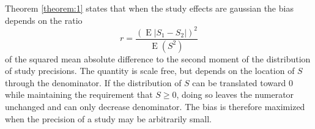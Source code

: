 \documentclass[12pt]{article}
\renewcommand{\P}{P}
\newcommand{\biasratio}{r}%
\newcommand{\s}{S}
\newcommand{\x}{X}
\DeclareMathOperator{\E}{E}
\DeclareMathOperator{\V}{Var}
\newcommand{\comment}[1]{
  \iftoggle{commenttoggle}{
    {\normalsize{\color{red}{ #1}}\normalsize}
  }
  {}
}
\begin{document}

  
  Theorem \ref{theorem:1} states that when the study effects are gaussian the bias depends on the ratio
  $$
  \biasratio=\frac{(\E|\s_1-\s_2|)^2}{\E(\s^2)}
  $$
  of the squared mean absolute difference to the second moment of the
  distribution of study precisions. The quantity is scale free, but
  depends on the location of $\s$ through the denominator. If the
  distribution of $\s$ can be translated toward $0$ while maintaining
  the requirement that $S\ge 0$, doing so leaves the numerator
  unchanged and can only decrease denominator. The bias is
  therefore maximized when the precision of a study may be arbitrarily
  small. %
\end{document}
